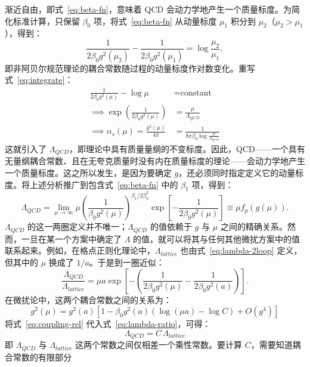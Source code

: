 渐近自由，即式~\eqref{eq:beta-fn}，意味着 QCD 会动力学地产生一个质量标度。为简化标准计算，只保留 $\beta_0$ 项，将式~\eqref{eq:beta-fn} 从动量标度 $\mu_1$ 积分到 $\mu_2$（$\mu_2 > \mu_1$），得到：
\begin{equation}
  \frac{1}{2\beta_0 g^2(\mu_2)} - \frac{1}{2\beta_0 g^2(\mu_1)}
  = \log\frac{\mu_2}{\mu_1},
  \label{eq:integrate}
\end{equation}
即非阿贝尔规范理论的耦合常数随过程的动量标度作对数变化。重写式~\eqref{eq:integrate}：
\begin{equation}
  \begin{aligned}
    \frac{1}{2\beta_0 g^2(\mu)} - \log\mu &= \text{constant} \\
    \implies \exp\left(\frac{1}{2\beta_0 g^2(\mu)}\right)
      &= \frac{\mu}{\Lambda_{QCD}} \\
    \implies \alpha_s(\mu) = \frac{g^2(\mu)}{4\pi}
      &= \frac{1}{8\pi\beta_0\log\frac{\mu}{\Lambda_{QCD}}}
  \end{aligned}
  \label{eq:alpha-s}
\end{equation}
这就引入了 $\Lambda_{QCD}$，即理论中具有质量量纲的不变标度。因此，QCD——一个具有无量纲耦合常数、且在无夸克质量时没有内在质量标度的理论——会动力学地产生一个质量标度。这之所以发生，是因为要确定 $g$，还必须同时指定定义它的动量标度。将上述分析推广到包含式~\eqref{eq:beta-fn} 中的 $\beta_1$ 项，得到：
\begin{equation}
  \Lambda_{QCD} = \lim_{\mu\to\infty}
    \mu \left(\frac{1}{\beta_0 g^2(\mu)}\right)^{\beta_1/2\beta_0^2}
    \exp\left[-\frac{1}{2\beta_0 g^2(\mu)}\right]
    \equiv \mu f_p(g(\mu)) .
  \label{eq:lambda-2loop}
\end{equation}
$\Lambda_{QCD}$ 的这一两圈定义并不唯一；$\Lambda_{QCD}$ 的值依赖于 $g$ 与 $\mu$ 之间的精确关系。然而，一旦在某一个方案中确定了 $\Lambda$ 的值，就可以将其与任何其他微扰方案中的值联系起来。例如，在格点正则化理论中，$\Lambda_{lattice}$ 也由式~\eqref{eq:lambda-2loop} 定义，但其中的 $\mu$ 换成了 $1/a$。于是到一圈近似：
\begin{equation}
  \frac{\Lambda_{QCD}}{\Lambda_{lattice}}
    = \mu a \exp\left[-\left(\frac{1}{2\beta_0 g^2(\mu)}
      - \frac{1}{2\beta_0 g^2(a)}\right)\right].
  \label{eq:lambda-ratio}
\end{equation}
在微扰论中，这两个耦合常数之间的关系为：
\begin{equation}
  g^2(\mu) = g^2(a)\left[1 - \beta_0 g^2(a)\left(\log(\mu a)
    - \log C\right) + O(g^4)\right]
  \label{eq:coupling-rel}
\end{equation}
将式~\eqref{eq:coupling-rel} 代入式~\eqref{eq:lambda-ratio}，可得：
\begin{equation}
  \Lambda_{QCD} = C\, \Lambda_{lattice}
  \label{eq:lambda-C}
\end{equation}
即 $\Lambda_{QCD}$ 与 $\Lambda_{lattice}$ 这两个常数之间仅相差一个乘性常数。要计算 $C$，需要知道耦合常数的有限部分

